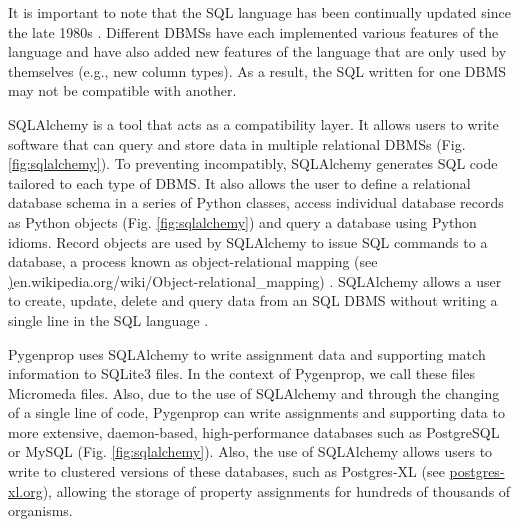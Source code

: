 It is important to note that the SQL language has been continually updated since the late 1980s \cite{sql1987guide, ISO9075}. Different DBMSs have each implemented various features of the language and have also added new features of the language that are only used by themselves (e.g., new column types). As a result, the SQL written for one DBMS may not be compatible with another. 

SQLAlchemy \cite{bayer2014sqlalchemy} is a tool that acts as a compatibility layer. It allows users to write software that can query and store data in multiple relational DBMSs (Fig. \ref{fig:sqlalchemy}). To preventing incompatibly, SQLAlchemy generates SQL code tailored to each type of DBMS. It also allows the user to define a relational database schema in a series of Python classes, access individual database records as Python objects (Fig. \ref{fig:sqlalchemy}) and query a database using Python idioms. Record objects are used by SQLAlchemy to issue SQL commands to a database, a process known as object-relational mapping \cite{ambler2000mapping,bayer2014sqlalchemy} (see \href{https://en.wikipedia.org/wiki/Object-relational\_mapping}){en.wikipedia.org/wiki/Object-relational\_mapping}) \cite{o2008object}. SQLAlchemy allows a user to create, update, delete and query data from an SQL DBMS without writing a single line in the SQL language \cite{bayer2014sqlalchemy}.

Pygenprop uses SQLAlchemy to write assignment data and supporting match information to SQLite3 files. In the context of Pygenprop, we call these files Micromeda files. Also, due to the use of SQLAlchemy and through the changing of a single line of code, Pygenprop can write assignments and supporting data to more extensive, daemon-based, high-performance databases such as PostgreSQL or MySQL (Fig. \ref{fig:sqlalchemy}). Also, the use of SQLAlchemy allows users to write to clustered versions of these databases, such as Postgres-XL (see \href{www.postgres-xl.org}{postgres-xl.org}), allowing the storage of property assignments for hundreds of thousands of organisms.

